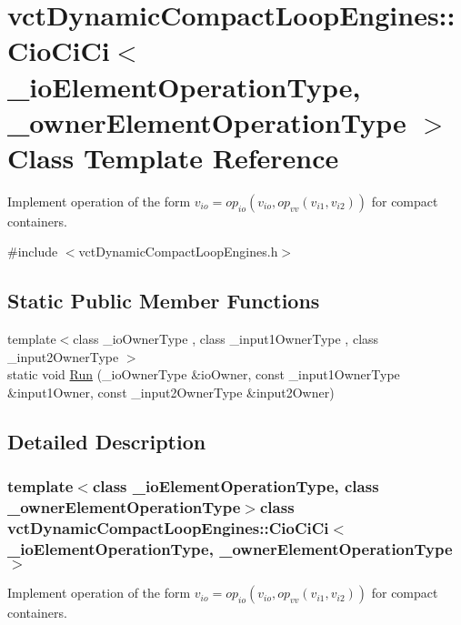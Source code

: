 \hypertarget{classvct_dynamic_compact_loop_engines_1_1_cio_ci_ci}{\section{vct\-Dynamic\-Compact\-Loop\-Engines\-:\-:Cio\-Ci\-Ci$<$ \-\_\-io\-Element\-Operation\-Type, \-\_\-owner\-Element\-Operation\-Type $>$ Class Template Reference}
\label{classvct_dynamic_compact_loop_engines_1_1_cio_ci_ci}
}


Implement operation of the form $v_{io} = op_{io}(v_{io}, op_{vv}(v_{i1}, v_{i2}))$ for compact containers.  




{\ttfamily \#include $<$vct\-Dynamic\-Compact\-Loop\-Engines.\-h$>$}

\subsection*{Static Public Member Functions}
\begin{DoxyCompactItemize}
\item 
{\footnotesize template$<$class \-\_\-io\-Owner\-Type , class \-\_\-input1\-Owner\-Type , class \-\_\-input2\-Owner\-Type $>$ }\\static void \hyperlink{classvct_dynamic_compact_loop_engines_1_1_cio_ci_ci_a65af76c1d75a6929e31317868542ba40}{Run} (\-\_\-io\-Owner\-Type \&io\-Owner, const \-\_\-input1\-Owner\-Type \&input1\-Owner, const \-\_\-input2\-Owner\-Type \&input2\-Owner)
\end{DoxyCompactItemize}


\subsection{Detailed Description}
\subsubsection*{template$<$class \-\_\-io\-Element\-Operation\-Type, class \-\_\-owner\-Element\-Operation\-Type$>$class vct\-Dynamic\-Compact\-Loop\-Engines\-::\-Cio\-Ci\-Ci$<$ \-\_\-io\-Element\-Operation\-Type, \-\_\-owner\-Element\-Operation\-Type $>$}

Implement operation of the form $v_{io} = op_{io}(v_{io}, op_{vv}(v_{i1}, v_{i2}))$ for compact containers. 

